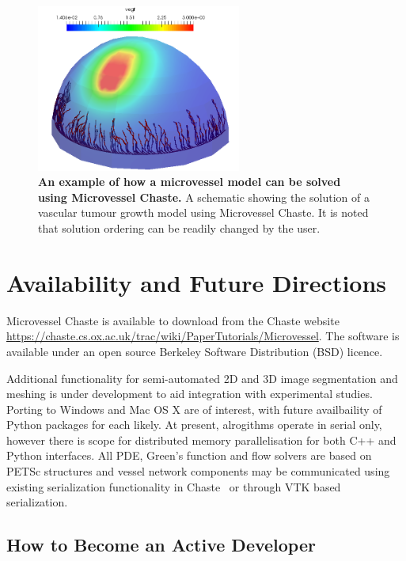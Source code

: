 \documentclass[10pt,letterpaper]{article}
\begin{document}
\begin{figure}[!h]
\centering
\includegraphics[width=0.6\textwidth]{Fig4.png}
\caption{{\bf An example of how a microvessel model can be solved using Microvessel Chaste.}
A schematic showing the solution of a vascular tumour growth model using Microvessel Chaste. It is noted that solution ordering can be readily changed by the user.}
\label{fig4}
\end{figure}

\section*{Availability and Future Directions}

Microvessel Chaste is available to download from the Chaste website  \url{https://chaste.cs.ox.ac.uk/trac/wiki/PaperTutorials/Microvessel}. The software is available under an open source Berkeley Software Distribution (BSD) licence. 

Additional functionality for semi-automated 2D and 3D image segmentation and meshing is under development to aid integration with experimental studies. Porting to Windows and Mac OS X are of interest, with future availbaility of Python packages for each likely. At present, alrogithms operate in serial only, however there is scope for distributed memory parallelisation for both C++ and Python interfaces. All PDE, Green's function and flow solvers are based on PETSc structures and vessel network components may be communicated using existing serialization functionality in Chaste~\cite{Harvey} or through VTK based serialization.

\subsection*{How to Become an Active Developer}
\end{document}
